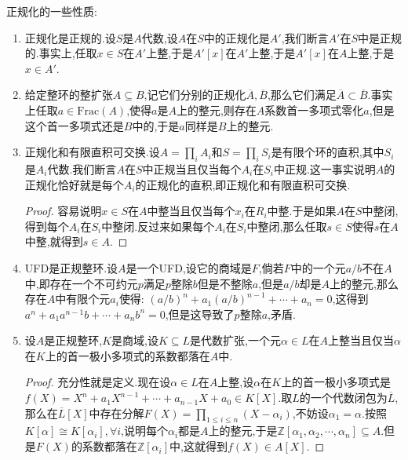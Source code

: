 正规化的一些性质:
\begin{enumerate}
	\item 正规化是正规的.设$S$是$A$代数,设$A$在$S$中的正规化是$A'$,我们断言$A'$在$S$中是正规的.事实上,任取$x\in S$在$A'$上整,于是$A'[x]$在$A'$上整,于是$A'[x]$在$A$上整,于是$x\in A'$.
	\item 给定整环的整扩张$A\subseteq B$,记它们分别的正规化$\overline{A},\overline{B}$,那么它们满足$\overline{A}\subset\overline{B}$.事实上任取$a\in\mathrm{Frac}(A)$,使得$a$是$A$上的整元,则存在$A$系数首一多项式零化$a$,但是这个首一多项式还是$B$中的,于是$a$同样是$B$上的整元.
	\item 正规化和有限直积可交换.设$A=\prod_iA_i$和$S=\prod_iS_i$是有限个环的直积,其中$S_i$是$A_i$代数.我们断言$A$在$S$中正规当且仅当每个$A_i$在$S_i$中正规.这一事实说明$A$的正规化恰好就是每个$A_i$的正规化的直积,即正规化和有限直积可交换.
	\begin{proof}
		
		容易说明$x\in S$在$A$中整当且仅当每个$x_i$在$R_i$中整.于是如果$A$在$S$中整闭,得到每个$A_i$在$S_i$中整闭.反过来如果每个$A_i$在$S_i$中整闭,那么任取$s\in S$使得$s$在$A$中整,就得到$s\in A$.
	\end{proof}
	\item UFD是正规整环.设$A$是一个UFD,设它的商域是$F$,倘若$F$中的一个元$a/b$不在$A$中,即存在一个不可约元$p$满足$p$整除$b$但是不整除$a$,但是$a/b$却是$A$上的整元,那么存在$A$中有限个元$a_i$使得:
	$(a/b)^n+a_1(a/b)^{n-1}+\cdots+a_n=0$,这得到$a^n+a_1a^ {n-1}b+\cdots+a_nb^n=0$,但是这导致了$p$整除$a$,矛盾.
	\item 设$A$是正规整环,$K$是商域,设$K\subseteq L$是代数扩张,一个元$\alpha\in L$在$A$上整当且仅当$\alpha$在$K$上的首一极小多项式的系数都落在$A$中.
	\begin{proof}
		
		充分性就是定义.现在设$\alpha\in L$在$A$上整,设$\alpha$在$K$上的首一极小多项式是$f(X)=X^n+a_1X^{n-1}+\cdots+a_{n-1}X+a_0\in K[X]$.取$L$的一个代数闭包为$\overline{L}$,那么在$\overline{L}[X]$中存在分解$F(X)=\prod_{1\le i\le n}(X-\alpha_i)$,不妨设$\alpha_1=\alpha$.按照$K[\alpha]\cong K[\alpha_i],\forall i$,说明每个$\alpha_i$都是$A$上的整元,于是$\mathbb{Z}[\alpha_1,\alpha_2,\cdots,\alpha_n]\subseteq A$.但是$F(X)$的系数都落在$\mathbb{Z}[\alpha_i]$中,这就得到$f(X)\in A[X]$.
	\end{proof}
\end{enumerate}

